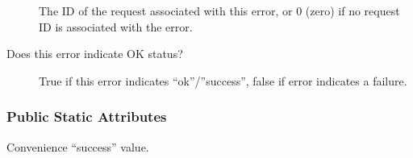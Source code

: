 \documentclass[letterpaper,10pt,english]{sphinxmanual}
\begin{document}
\begin{fulllineitems}
\begin{fulllineitems}
\begin{description}
\item[{}] \leavevmode
The ID of the request associated with this error, or 0 (zero) if no request ID is associated with the error. 

\end{description}


\end{fulllineitems}


\begin{fulllineitems}
\label{\detokenize{cpp_api/classnvidia_1_1inferenceserver_1_1client_1_1Error:_CPPv4NK6nvidia15inferenceserver6client5Error4IsOkEv}}%
\pysigstartmultiline
{}\label{\detokenize{cpp_api/classnvidia_1_1inferenceserver_1_1client_1_1Error:classnvidia_1_1inferenceserver_1_1client_1_1Error_1ae9f38b1f7ff0986190433ec2f8d97602}}%
\pysigstopmultiline
Does this error indicate OK status? 

\begin{description}
\item[{}] \leavevmode
True if this error indicates “ok”/”success”, false if error indicates a failure. 

\end{description}


\end{fulllineitems}

\subsubsection*{Public Static Attributes}

\begin{fulllineitems}
\label{\detokenize{cpp_api/classnvidia_1_1inferenceserver_1_1client_1_1Error:_CPPv4N6nvidia15inferenceserver6client5Error7SuccessE}}%
\pysigstartmultiline
{}%
\pysigstopmultiline
Convenience “success” value. 


\end{fulllineitems}
\end{fulllineitems}
\end{document}
